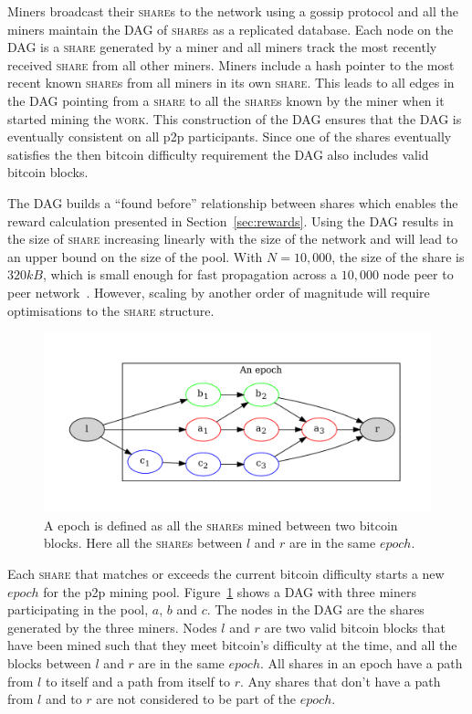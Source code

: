 \documentclass{article}
\begin{document}
Miners broadcast their \textsc{share}s to the network using a gossip
protocol and all the miners maintain the DAG of \textsc{share}s as a
replicated database. Each node on the DAG is a \textsc{share}
generated by a miner and all miners track the most recently received
\textsc{share} from all other miners. Miners include a hash pointer to
the most recent known \textsc{share}s from all miners in its own
\textsc{share}. This leads to all edges in the DAG pointing from a
\textsc{share} to all the \textsc{share}s known by the miner when it
started mining the \textsc{work}. This construction of the DAG ensures
that the DAG is eventually consistent on all p2p participants. Since
one of the shares eventually satisfies the then bitcoin difficulty
requirement the DAG also includes valid bitcoin blocks.

The DAG builds a ``found before'' relationship between shares which
enables the reward calculation presented in
Section~\ref{sec:rewards}. Using the DAG results in the size of
\textsc{share} increasing linearly with the size of the network and
will lead to an upper bound on the size of the pool. With
$N = 10,000$, the size of the share is $320kB$, which is small enough
for fast propagation across a $10,000$ node peer to peer
network~\cite{information-propagation}. However, scaling by another
order of magnitude will require optimisations to the \textsc{share}
structure.

\begin{figure}
  \includegraphics[width=1.0\textwidth]{epoch}
  \caption{A epoch is defined as all the \textsc{share}s mined between two
    bitcoin blocks. Here all the \textsc{share}s between $l$ and $r$ are in
    the same $epoch$.}\label{fig:epoch}
\end{figure}

Each \textsc{share} that matches or exceeds the current bitcoin
difficulty starts a new $epoch$ for the p2p mining
pool. Figure~\ref{fig:epoch} shows a DAG with three miners
participating in the pool, $a$, $b$ and $c$. The nodes in the DAG are
the shares generated by the three miners. Nodes $l$ and $r$ are two
valid bitcoin blocks that have been mined such that they meet
bitcoin's difficulty at the time, and all the blocks between $l$ and
$r$ are in the same $epoch$. All shares in an epoch have a path from
$l$ to itself and a path from itself to $r$. Any shares that don't
have a path from $l$ and to $r$ are not considered to be part of the
$epoch$.
\end{document}
